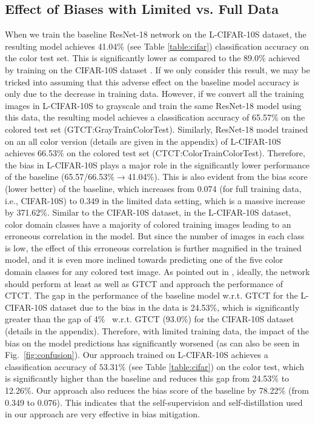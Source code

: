 \documentclass[10pt,twocolumn,letterpaper]{article}
\begin{document}
\subsection{Effect of Biases with Limited vs. Full Data }\label{sec:story}
When we train the baseline ResNet-18 network on the L-CIFAR-10S dataset, the resulting model achieves 41.04\% (see Table \ref{table:cifar}) classification accuracy on the color test set. This is significantly lower as compared to the 89.0\% achieved by training on the CIFAR-10S dataset \cite{wang2020towards}. If we only consider this result, we may be tricked into assuming that this adverse effect on the baseline model accuracy is only due to the decrease in training data. However, if we convert all the training images in L-CIFAR-10S to grayscale and train the same ResNet-18 model using this data, the resulting model achieves a classification accuracy of 65.57\% on the colored test set (GTCT:GrayTrainColorTest). Similarly, ResNet-18 model trained on an all color version (details are given in the appendix) of L-CIFAR-10S achieves 66.53\% on the colored test set (CTCT:ColorTrainColorTest). Therefore, the bias in L-CIFAR-10S plays a major role in the significantly lower performance of the baseline (65.57/66.53\%$\rightarrow$41.04\%). This is also evident from the bias score (lower better) of the baseline, which increases from 0.074 (for full training data, i.e., CIFAR-10S) to 0.349 in the limited data setting, which is a massive increase by 371.62\%. Similar to the CIFAR-10S dataset, in the L-CIFAR-10S dataset, color domain classes have a majority of colored training images leading to an erroneous correlation in the model. But since the number of images in each class is low, the effect of this erroneous correlation is further magnified in the trained model, and it is even more inclined towards predicting one of the five color domain classes for any colored test image. As pointed out in \cite{wang2020towards}, ideally, the network should perform at least as well as GTCT and approach the performance of CTCT. The gap in the performance of the baseline model w.r.t. GTCT for the L-CIFAR-10S dataset due to the bias in the data is 24.53\%, which is significantly greater than the gap of 4\%~\cite{wang2020towards} w.r.t. GTCT (93.0\%) for the CIFAR-10S dataset (details in the appendix). Therefore, with limited training data, the impact of the bias on the model predictions has significantly worsened (as can also be seen in Fig.~\ref{fig:confusion}). Our approach trained on L-CIFAR-10S achieves a classification accuracy of $53.31\%$ (see Table \ref{table:cifar}) on the color test, which is significantly higher than the baseline and reduces this gap from 24.53\% to 12.26\%. Our approach also reduces the bias score of the baseline by 78.22\% (from 0.349 to 0.076). This indicates that the self-supervision and self-distillation used in our approach are very effective in bias mitigation.
\end{document}

